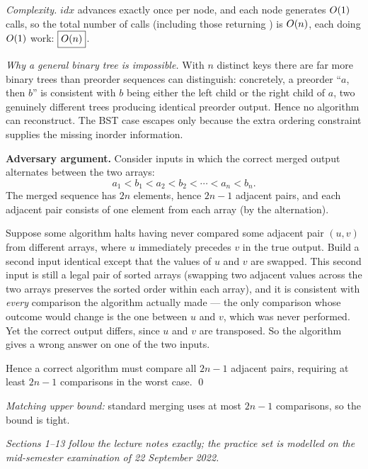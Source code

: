 \emph{Complexity.} $\mathit{idx}$ advances exactly once per node, and each node generates $O(1)$
calls, so the total number of calls (including those returning ) is $O(n)$, each
doing $O(1)$ work: $\boxed{O(n)}$.

\emph{Why a general binary tree is impossible.} With $n$ distinct keys there are far more binary
trees than preorder sequences can distinguish: concretely, a preorder ``$a$, then $b$'' is
consistent with $b$ being either the left child or the right child of $a$, two genuinely
different trees producing identical preorder output. Hence no algorithm can reconstruct. The BST
case escapes only because the extra ordering constraint supplies the missing inorder information.

\textbf{Adversary argument.} Consider inputs in which the correct merged output alternates
between the two arrays:
\[
  a_1<b_1<a_2<b_2<\cdots<a_n<b_n .
\]
The merged sequence has $2n$ elements, hence $2n-1$ adjacent pairs, and each adjacent pair
consists of one element from each array (by the alternation).

Suppose some algorithm halts having never compared some adjacent pair $(u,v)$ from different
arrays, where $u$ immediately precedes $v$ in the true output. Build a second input identical
except that the values of $u$ and $v$ are swapped. This second input is still a legal pair of
sorted arrays (swapping two adjacent values across the two arrays preserves the sorted order
within each array), and it is consistent with \emph{every} comparison the algorithm actually made
--- the only comparison whose outcome would change is the one between $u$ and $v$, which was never
performed. Yet the correct output differs, since $u$ and $v$ are transposed. So the algorithm
gives a wrong answer on one of the two inputs.

Hence a correct algorithm must compare all $2n-1$ adjacent pairs, requiring at least $2n-1$
comparisons in the worst case. \qed

\emph{Matching upper bound:} standard merging uses at most $2n-1$ comparisons, so the bound is
tight.

\vfill
\begin{center}\small\itshape
Sections 1--13 follow the lecture notes exactly; the practice set is modelled on the
mid-semester examination of 22 September 2022.
\end{center}
